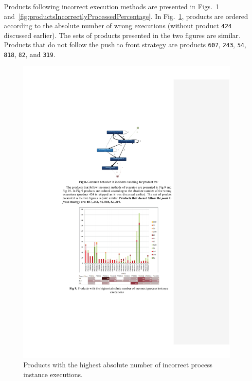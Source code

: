 \documentclass[lnbip]{svmultln}
\begin{document}
Products following incorrect execution methods are presented in Figs.~\ref{fig:productsIncorrectlyProcessed} and~\ref{fig:productsIncorrectlyProcessedPercentage}. In Fig.~\ref{fig:productsIncorrectlyProcessed}, products are ordered according to the absolute number of wrong executions (without product \texttt{424} discussed earlier). The sets of products presented in the two figures are similar. Products that do not follow the push to front strategy are products \texttt{607}, \texttt{243}, \texttt{54}, \texttt{818}, \texttt{82}, and \texttt{319}.
 
\begin{figure}
\centering
\includegraphics[width=.8\textwidth]{"figs/pic 11"}
\caption{Products with the highest absolute number of incorrect process instance executions.}
\label{fig:productsIncorrectlyProcessed}
\end{figure}
 
\end{document}
